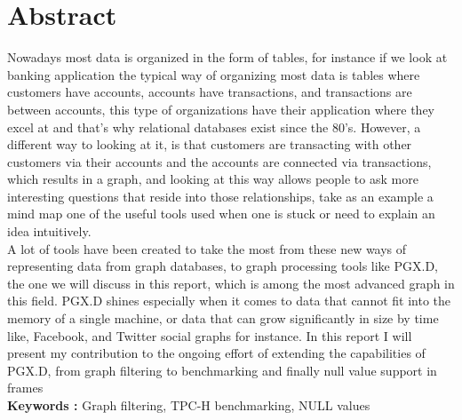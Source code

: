 \chapter*{Abstract}
Nowadays most data is organized in the form of tables, for instance if we look at banking application the typical way of organizing most data is tables where customers have accounts, accounts have transactions, and transactions are between accounts, this type of organizations have their application where they excel at and that’s why relational databases exist since the 80’s. However, a different way to looking at it, is that customers are transacting with other customers via their accounts and the accounts are connected via transactions, which results in a graph, and looking at this way allows people to ask more interesting questions that reside into those relationships, take as an example a mind map one of the useful tools used when one is stuck or need to explain an idea intuitively. 
\\
A lot of tools have been created to take the most from these new ways of representing data from graph databases, to graph processing tools like PGX.D, the one we will discuss in this report, which is among the most advanced graph in this field. PGX.D shines especially when it comes to data that cannot fit into the memory of a single machine, or data that can grow significantly in size by time like, Facebook, and Twitter social graphs for instance. In this report I will present my contribution to the ongoing effort of extending the capabilities of PGX.D, from graph filtering to benchmarking and finally null value support in frames
\\
\noindent\textbf{Keywords :} Graph filtering, TPC-H benchmarking, NULL values

\newpage




